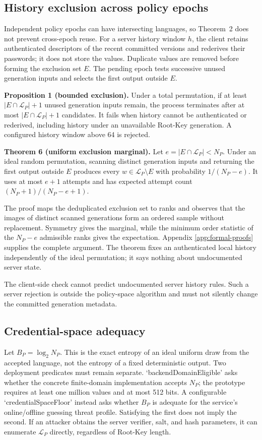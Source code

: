 \documentclass[preprint,12pt]{elsarticle}
\newcommand{\Lang}{\mathcal{L}}
\begin{document}
\subsection{History exclusion across policy epochs}

Independent policy epochs can have intersecting languages, so Theorem~2 does
not prevent cross-epoch reuse. For a server history window $h$, the client
retains authenticated descriptors of the recent committed versions and
rederives their passwords; it does not store the values. Duplicate values are
removed before forming the exclusion set $E$. The pending epoch tests
successive unused generation inputs and selects the first output outside $E$.

\textbf{Proposition 1 (bounded exclusion).} Under a total permutation, if at
least $|E\cap\Lang_P|+1$ unused generation inputs remain, the process terminates
after at most $|E\cap\Lang_P|+1$ candidates. It fails when history cannot be
authenticated or rederived, including history under an unavailable Root-Key
generation. A configured history window above 64 is rejected.

\textbf{Theorem 6 (uniform exclusion marginal).} Let $e=|E\cap\Lang_P|<N_P$.
Under an ideal random permutation, scanning distinct generation inputs and
returning the first output outside $E$ produces every
$w\in\Lang_P\setminus E$ with probability $1/(N_P-e)$. It uses at most $e+1$
attempts and has expected attempt count $(N_P+1)/(N_P-e+1)$.

The proof maps the deduplicated exclusion set to ranks and observes that the
images of distinct scanned generations form an ordered sample without
replacement. Symmetry gives the marginal, while the minimum order statistic of
the $N_P-e$ admissible ranks gives the expectation. Appendix
\ref{app:formal-proofs} supplies the complete argument. The theorem fixes an
authenticated local history independently of the ideal permutation; it says
nothing about undocumented server state.

The client-side check cannot predict undocumented server history rules. Such a
server rejection is outside the policy-space algorithm and must not silently
change the committed generation metadata.

\subsection{Credential-space adequacy}

Let $B_P=\log_2N_P$. This is the exact entropy of an ideal uniform draw from
the accepted language, not the entropy of a fixed deterministic output. Two
deployment predicates must remain separate. `backendDomainEligible' asks
whether the concrete finite-domain implementation accepts $N_P$; the prototype
requires at least one million values and at most 512 bits. A configurable
`credentialSpaceFloor' instead asks whether $B_P$ is adequate for the service's
online/offline guessing threat profile. Satisfying the first does not imply the
second. If an attacker obtains the server verifier, salt, and hash parameters,
it can enumerate $\Lang_P$ directly, regardless of Root-Key length.
\end{document}
